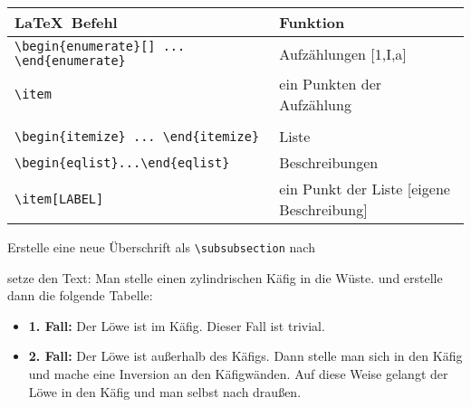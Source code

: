 \begin{frame}[fragile]
	\begin{center}
	\begin{tabular}{ll}
		\toprule
		\LaTeX\ Befehl										&	Funktion									\\ \midrule
		\lstinline|\begin{enumerate}[] ... \end{enumerate}|			&	Aufzählungen [1,I,a]								\\
				\lstinline|\item|							&	ein Punkten der Aufzählung	\\ \\
		\lstinline|\begin{itemize} ... \end{itemize}|		&	Liste				\\ 
		\lstinline|\begin{eqlist}...\end{eqlist}|	&	 Beschreibungen				\\
		\lstinline|\item[LABEL]|							&	ein Punkt der Liste [eigene Beschreibung]	\\
		\bottomrule
	\end{tabular}
\end{center}
	\begin{Aufgabe}
		Erstelle eine neue Überschrift als \lstinline[basicstyle=\normalfont\normalsize]|\subsubsection| nach 
		
		\textrm{}
		
		setze den Text:	\textrm{Man stelle einen zylindrischen Käfig in die Wüste.}	und erstelle dann die folgende Tabelle:
	\end{Aufgabe}
	\begin{outputbox}
		\vspace{-0.2cm}
		\begin{itemize}
			\item
				\textbf{1. Fall:} Der Löwe ist im Käfig. Dieser Fall ist trivial.
			\item
				\textbf{2. Fall:} Der Löwe ist außerhalb des Käfigs. Dann stelle man sich in den Käfig und mache eine Inversion an den Käfigwänden. Auf diese Weise gelangt der Löwe in den Käfig und man selbst nach draußen.
		\end{itemize}
		\vspace{-0.2cm}
	\end{outputbox}
\end{frame}
